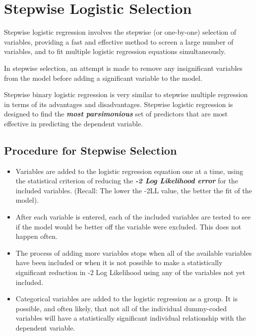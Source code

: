 \documentclass[a4paper,12pt]{article}
\begin{document}
\section{Stepwise Logistic Selection}
Stepwise logistic regression involves the stepwise (or one-by-one) selection of variables,
providing a fast and effective method to screen a large number of variables, and to fit
multiple logistic regression equations simultaneously.

In stepwise selection, an attempt is made to remove any insignificant variables from the model before adding a significant variable to the model.

Stepwise binary logistic regression is very similar to stepwise multiple regression in terms of its advantages and disadvantages. Stepwise logistic regression is designed to find the \textbf{\textit{most parsimonious}} set of predictors that are most effective in predicting the dependent variable.

\subsection{Procedure for Stepwise Selection}
\begin{itemize}
	\item Variables are added to the logistic regression equation one at a time, using the statistical criterion of reducing the \textbf{\textit{-2 Log Likelihood error}} for the included variables. (Recall: The lower the -2LL value, the better the fit of the model).
	
\item After each variable is entered, each of the included variables are tested to see if the model would be better off the variable were excluded. This does not happen often.
	
\item The process of adding more variables stops when all of the available variables have been included or when it is not possible to make a statistically significant reduction in -2 Log Likelihood using any of the variables not yet included.
	
\item Categorical variables are added to the logistic regression as a group. It is possible, and often likely, that not all of the individual dummy-coded variables will have a statistically significant individual relationship with the dependent variable. 
\end{itemize}

\end{document}
